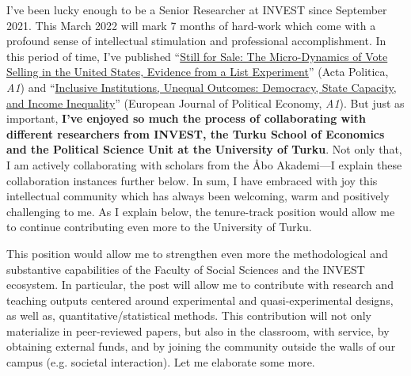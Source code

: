 \documentclass[10pt,stdletter,dateno,sigleft]{newlfm} %
\begin{document}
\begin{newlfm}
I've been lucky enough to be a Senior Researcher at INVEST since September 2021. This March 2022 will mark 7 months of hard-work which come with a profound sense of intellectual stimulation and professional accomplishment. In this period of time, I've published ``\href{https://link.springer.com/article/10.1057/s41269-020-00174-4}{Still for Sale: The Micro-Dynamics of Vote Selling in the United States, Evidence from a List Experiment}'' (Acta Politica, \emph{A1}) and ``\href{https://www.sciencedirect.com/science/article/pii/S0176268021000471?via%3Dihub}{Inclusive Institutions, Unequal Outcomes: Democracy, State Capacity, and Income Inequality}'' (European Journal of Political Economy, \emph{A1}). But just as important, {\bf I've enjoyed so much the process of collaborating with different researchers from INVEST, the Turku School of Economics and the Political Science Unit at the University of Turku}. Not only that, I am actively collaborating with scholars from the \AA bo Akademi---I explain these collaboration instances further below. In sum, I have embraced with joy this intellectual community which has always been welcoming, warm and positively challenging to me. As I explain below, the tenure-track position would allow me to continue contributing even more to the University of Turku.

This position would allow me to strengthen even more the methodological and substantive capabilities of the Faculty of Social Sciences and the INVEST ecosystem. In particular, the post will allow me to contribute with research and teaching outputs centered around experimental and quasi-experimental designs, as well as, quantitative/statistical methods. This contribution will not only materialize in peer-reviewed papers, but also in the classroom, with service, by obtaining external funds, and by joining the community outside the walls of our campus (e.g. societal interaction). Let me elaborate some more. 


\end{newlfm}
\end{document}
